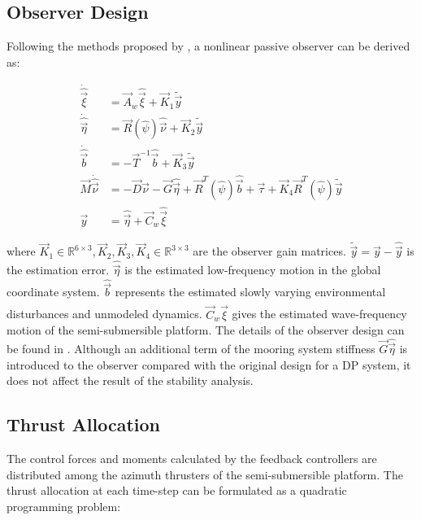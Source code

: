 \begin{sloppypar}
\subsection{Observer Design}
Following the methods proposed by \cite{fossen1999passive}, a nonlinear passive observer can be derived as:

\begin{align}
\dot{\hat{\vec{\xi}}} &= \vec{A}_w\hat{\vec{\xi}} + \vec{K}_1\tilde{\vec{y}} \\
\dot{\hat{\vec{\eta}}} &= \vec{R}(\hat{\psi})\hat{\vec{\nu}} + \vec{K}_2\tilde{\vec{y}} \\
\dot{\hat{\vec{b}}} &= -\vec{T}^{-1}\hat{\vec{b}} + \vec{K}_3\tilde{\vec{y}} \\
\vec{M}\dot{\hat{\vec{\nu}}} &= -\vec{D}\hat{\vec{\nu}} - \vec{G}\hat{\vec{\eta}} + \vec{R}^T(\hat{\psi})\hat{\vec{b}} + \vec{\tau} + \vec{K}_4\vec{R}^T(\hat{\psi})\tilde{\vec{y}} \\
\vec{y} &= \hat{\vec{\eta}} + \vec{C}_w\hat{\vec{\xi}}
\end{align}

\noindent where $\vec{K}_1 \in \mathbb{R}^{6\times3}, \vec{K}_2, \vec{K}_3, \vec{K}_4 \in \mathbb{R}^{3\times3}$ are the observer gain matrices. $\tilde{\vec{y}} = \vec{y}-\hat{\vec{y}}$ is the estimation error. $\hat{\vec{\eta}}$ is the estimated low-frequency motion in the global coordinate system. $\hat{\vec{b}}$ represents the estimated slowly varying environmental disturbances and unmodeled dynamics. $\vec{C}_w\hat{\vec{\xi}}$ gives the estimated wave-frequency motion of the semi-submersible platform. The details of the observer design can be found in \cite{fossen1999passive}. Although an additional term of the mooring system stiffness $\vec{G}\hat{\vec{\eta}}$ is introduced to the observer compared with the original design for a DP system, it does not affect the result of the stability analysis.


\subsection{Thrust Allocation}
The control forces and moments calculated by the feedback controllers are distributed among the azimuth thrusters of the semi-submersible platform. The thrust allocation at each time-step can be formulated as a quadratic programming problem:


\end{sloppypar}
